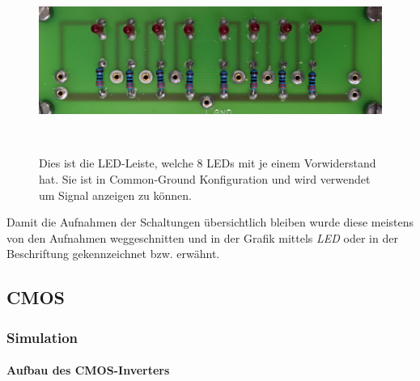 \documentclass[12pt,english,ngerman]{scrartcl}
\begin{document}
\begin{figure}[H]
  \centering
  \includegraphics[width=\textwidth, height=6cm,keepaspectratio]{./figures/messungen/ledleiste.jpg}
  \caption{Dies ist die LED-Leiste, welche 8 LEDs mit je einem Vorwiderstand
  hat. Sie ist in Common-Ground Konfiguration und wird verwendet um Signal
  anzeigen zu können.}
  \label{fig:aufbau_led}
\end{figure}

Damit die Aufnahmen der Schaltungen übersichtlich bleiben wurde diese meistens
von den Aufnahmen weggeschnitten und in der Grafik mittels \textit{LED} oder in
der Beschriftung gekennzeichnet bzw. erwähnt.

\subsection{CMOS}
\subsubsection{Simulation}
\paragraph{Aufbau des CMOS-Inverters}

\end{document}

